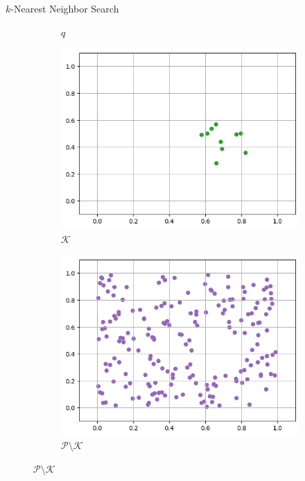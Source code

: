 \begin{frame}{\(k\)-Nearest Neighbor Search}
\begin{figure}[ht]
\begin{subfigure}{0.24\textwidth}
            \caption*{\(q\)}
        \end{subfigure}
    \hfill
        \begin{subfigure}{0.24\textwidth}
            \includegraphics[width=\textwidth]{images/sim-search-knn}
            \caption*{\(\mathcal{K}\)}
        \end{subfigure}
    \hfill
        \begin{subfigure}{0.24\textwidth}
            \includegraphics[width=\textwidth]{images/sim-search-Pminus}
            \caption*{\(\mathcal{P} \setminus \mathcal{K}\)}
        \end{subfigure}
    \end{figure}
    \hfill
\end{frame}


